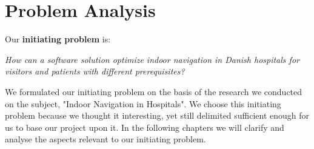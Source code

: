 \chapter{Problem Analysis} \label{cha:problem_analysis}

Our \textbf{initiating problem} is:

\begin{displayquote}
    \textit{How can a software solution optimize indoor navigation in Danish hospitals for visitors and patients with different prerequisites?}\label{sub:init}
\end{displayquote}

We formulated our initiating problem on the basis of the research we conducted on the subject, "Indoor Navigation in Hospitals". We choose this initiating problem because we thought it interesting, yet still delimited sufficient enough for us to base our project upon it. In the following chapters we will clarify and analyse the aspects relevant to our initiating problem.










%
